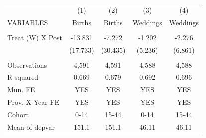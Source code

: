\begin{tabular}{lcccc} \hline
 & (1) & (2) & (3) & (4) \\
VARIABLES & Births & Births & Weddings & Weddings \\ \hline
 &  &  &  &  \\
Treat (W) X Post & -13.831 & -7.272 & -1.202 & -2.276 \\
 & (17.733) & (30.435) & (5.236) & (6.861) \\
 &  &  &  &  \\
Observations & 4,591 & 4,591 & 4,588 & 4,588 \\
R-squared & 0.669 & 0.679 & 0.692 & 0.696 \\
Mun. FE & YES & YES & YES & YES \\
Prov. X Year FE & YES & YES & YES & YES \\
Cohort & 0-14 & 15-44 & 0-14 & 15-44 \\
 Mean of depvar & 151.1 & 151.1 & 46.11 & 46.11 \\ \hline
\end{tabular}
